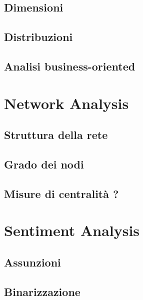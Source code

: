 \documentclass[hidelinks, 12pt]{article}
\begin{document}
\subsection{Dimensioni}

\subsection{Distribuzioni}

\subsection{Analisi business-oriented}



\clearpage



\section{Network Analysis}

\subsection{Struttura della rete}

\subsection{Grado dei nodi}

\subsection{Misure di centralità ?}



\clearpage



\section{Sentiment Analysis}


\subsection{Assunzioni}
\label{sec:bn-assumptions}

\subsection{Binarizzazione}
\end{document}
